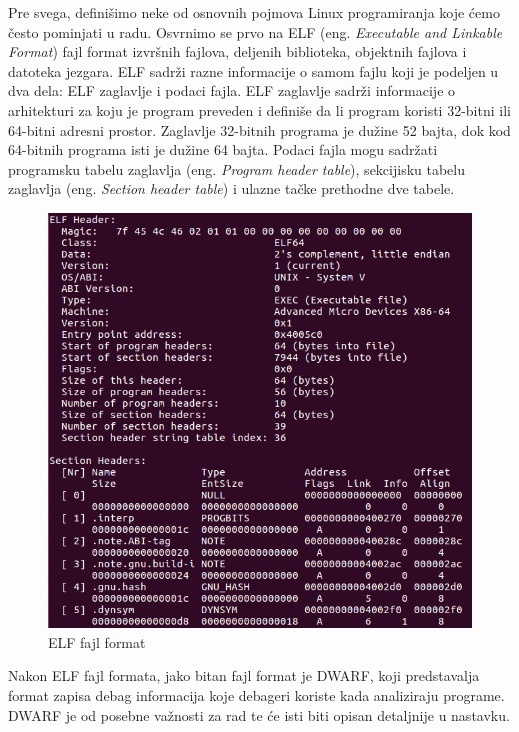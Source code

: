 \documentclass[12pt,oneside]{memoir}
\begin{document}
Pre svega, definišimo neke od osnovnih pojmova Linux programiranja koje ćemo često pominjati u radu.
Osvrnimo se prvo na ELF (eng. \emph{Executable and Linkable Format}) fajl format izvršnih fajlova, deljenih biblioteka, objektnih fajlova i datoteka jezgara. ELF sadrži razne informacije o samom fajlu koji je podeljen u dva dela: ELF zaglavlje i podaci fajla. ELF zaglavlje sadrži informacije o arhitekturi za koju je program preveden i definiše da li program koristi 32-bitni ili 64-bitni adresni prostor. Zaglavlje 32-bitnih programa je dužine 52 bajta, dok kod 64-bitnih programa isti je dužine 64 bajta. Podaci fajla mogu sadržati programsku tabelu zaglavlja (eng. \emph{Program header table}), sekcijisku tabelu zaglavlja (eng. \emph{Section header table}) i ulazne tačke prethodne dve tabele.

\begin{figure}[h!]
	\begin{center}
		\includegraphics[scale=0.5]{slike/elf_example.png}
	\end{center}
	\caption{ELF fajl format}
	\label{fig:elf}
\end{figure}

Nakon ELF fajl formata, jako bitan fajl format je DWARF, koji predstavalja format zapisa debag informacija koje debageri koriste kada analiziraju programe. DWARF je od posebne važnosti za rad te će isti biti opisan detaljnije u nastavku.
\end{document}
